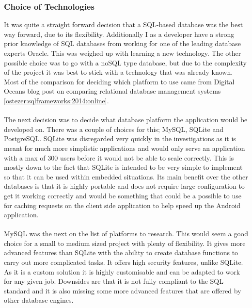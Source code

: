 \subsubsection{Choice of Technologies}
\label{sec:database_choice_of_tech}
 
It was quite a straight forward decision that a SQL-based database was the best way forward, due to its flexibility. Additionally I as a developer have a strong prior knowledge of SQL databases from working for one of the leading database experts Oracle. This was weighed up with learning a new technology. The other possible choice was to go with a noSQL type database, but due to the complexity of the project it was best to stick with a technology that was already known. Most of the comparison for deciding which platform to use came from Digital Oceans blog post on comparing relational database management systems \ref{ostezer:sqlframeworks:2014:online}.\\
\\
The next decision was to decide what database platform the application would be developed on. There was a couple of choices for this; MySQL, SQLite and PostgreSQL. SQLite was disregarded very quickly in the investigations as it is meant for much more simplistic applications and would only serve an application with a max of 300 users before it would not be able to scale correctly. This is mostly down to the fact that SQLite is intended to be very simple to implement so that it can be used within embedded situations. Its main benefit over the other databases is that it is highly portable and does not require large configuration to get it working correctly and would be something that could be a possible to use for caching requests on the client side application to help speed up the Android application.\\
\\
MySQL was the next on the list of platforms to research. This would seem a good choice for a small to medium sized project with plenty of flexibility. It gives more advanced features than SQLite with the ability to create database functions to carry out more complicated tasks. It offers high security features, unlike SQLite. As it is a custom solution it is highly customisable and can be adapted to work for any given job. Downsides are that it is not fully compliant to the SQL standard and it is also missing some more advanced features that are offered by other database engines.\\
\\

